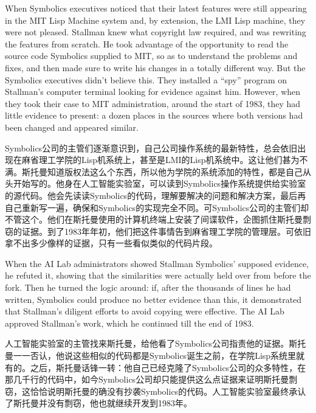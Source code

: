 \ifdefined\eng
When Symbolics executives noticed that their latest features were still appearing in the MIT Lisp Machine system and, by extension, the LMI Lisp machine, they were not pleased. Stallman knew what copyright law required, and was rewriting the features from scratch.  He took advantage of the opportunity to read the source code Symbolics supplied to MIT, so as to understand the problems and fixes, and then made sure to write his changes in a totally different way.  But the Symbolics executives didn't believe this.  They installed a ``spy'' program on Stallman's computer terminal looking for evidence against him.  However, when they took their case to MIT administration, around the start of 1983, they had little evidence to present: a dozen places in the sources where both versions had been changed and appeared similar.
\fi

\ifdefined\chs
Symbolics公司的主管们逐渐意识到，自己公司操作系统的最新特性，总会依旧出现在麻省理工学院的Lisp机系统上，甚至是LMI的Lisp机系统中。这让他们甚为不满。斯托曼知道版权法这么个东西，所以他为学院的系统添加的特性，都是自己从头开始写的。他身在人工智能实验室，可以读到Symbolics操作系统提供给实验室的源代码。他会先读读Symbolics的代码，理解要解决的问题和解决方案，最后再自己重新写一遍，确保和Symbolics的实现完全不同。可Symbolics公司的主管们却不管这个。他们在斯托曼使用的计算机终端上安装了间谍软件，企图抓住斯托曼剽窃的证据。到了1983年年初，他们把这件事情告到麻省理工学院的管理层。可依旧拿不出多少像样的证据，只有一些看似类似的代码片段。
\fi

\ifdefined\eng
When the AI Lab administrators showed Stallman Symbolics' supposed evidence, he refuted it, showing that the similarities were actually held over from before the fork.  Then he turned the logic around: if, after the thousands of lines he had written, Symbolics could produce no better evidence than this, it demonstrated that Stallman's diligent efforts to avoid copying were effective.  The AI Lab approved Stallman's work, which he continued till the end of 1983.
\fi

\ifdefined\chs
人工智能实验室的主管找来斯托曼，给他看了Symbolics公司指责他的证据。斯托曼一一否认，他说这些相似的代码都是Symbolics诞生之前，在学院Lisp系统里就有的。之后，斯托曼话锋一转：他自己已经克隆了Symbolics公司的众多特性，在那几千行的代码中，如今Symbolics公司却只能提供这么点证据来证明斯托曼剽窃，这恰恰说明斯托曼的确没有抄袭Symbolics的代码。人工智能实验室最终承认了斯托曼并没有剽窃，他也就继续开发到1983年。
\fi

